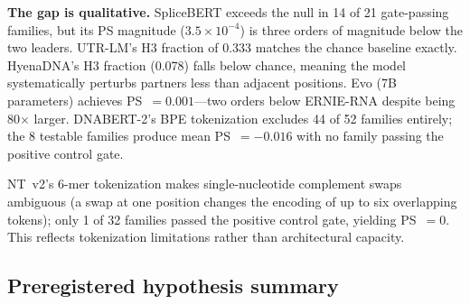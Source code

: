 \documentclass[11pt]{article}
\begin{document}
\textbf{The gap is qualitative.}
SpliceBERT exceeds the null in 14 of 21 gate-passing families, but
its PS magnitude ($3.5 \times 10^{-4}$) is three orders of magnitude
below the two leaders.  UTR-LM's H3 fraction of 0.333 matches the
chance baseline exactly.  HyenaDNA's H3 fraction (0.078) falls below
chance, meaning the model systematically perturbs partners less than
adjacent positions.  Evo (7B parameters) achieves PS~$= 0.001$---two
orders below ERNIE-RNA despite being 80$\times$ larger.
DNABERT-2's BPE tokenization excludes 44 of 52 families entirely;
the 8 testable families produce mean PS~$= -0.016$ with no family
passing the positive control gate.

NT~v2's 6-mer tokenization makes single-nucleotide complement swaps
ambiguous (a swap at one position changes the encoding of up to six
overlapping tokens); only 1 of 32 families passed the positive
control gate, yielding PS~$= 0$.  This reflects tokenization
limitations rather than architectural capacity.


\subsection{Preregistered hypothesis summary}
\label{sec:hypotheses}
\end{document}
